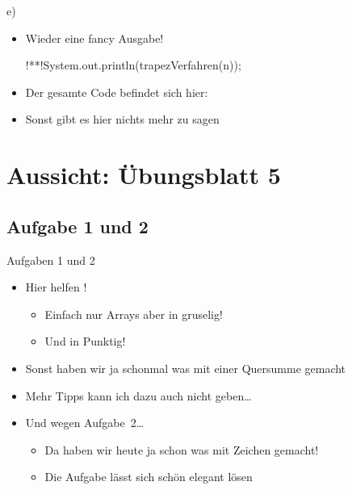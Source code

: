 \begin{frame}[fragile]{e)~}
\begin{itemize}[<+(1)->]
    \itemsep10pt
    \item Wieder eine fancy Ausgabe!
\begin{plainjava}[aboveskip=0pt]
!**!System.out.println(trapezVerfahren(n));
\end{plainjava}
    \item<4-> Der gesamte Code befindet sich hier:~
    \iffull\item<5-> Sonst gibt es hier nichts mehr zu sagen\fi
\end{itemize}
\end{frame}

\iffull
{}
\section{Aussicht: Übungsblatt 5}
\subsection{Aufgabe 1 und 2}
\begin{frame}{Aufgaben 1 und 2}
\begin{itemize}[<+(1)->]
    \itemsep9pt
    \item Hier helfen ! \begin{itemize}
        \item Einfach nur Arrays aber in gruselig!
        \item Und in Punktig! 
    \end{itemize}
    \item Sonst haben wir ja schonmal was mit einer Quersumme gemacht 
    \item Mehr Tipps kann ich dazu auch nicht geben\ldots
    \item Und wegen Aufgabe~2\ldots \begin{itemize}
        \item Da haben wir heute ja schon was mit Zeichen gemacht!
        \item Die Aufgabe lässt sich schön elegant lösen
    \end{itemize}
\end{itemize}
\end{frame}

